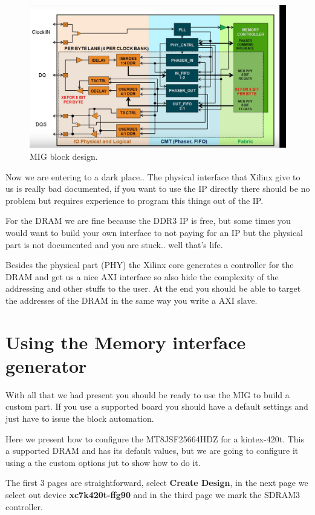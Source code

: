 \begin{figure}
    \centering
    \includegraphics[scale=0.35]{img/mig_phy.png}
    \caption{MIG block design.}
    \label{fig:mig_phy}
\end{figure}


Now we are entering to a dark place.. The physical interface that Xilinx give to us is really bad documented, if you want to use the IP directly there should be no problem but requires experience to program this things out of the IP.

For the DRAM we are fine because the DDR3 IP is free, but some times you would want to build your own interface to not paying for an IP but the physical part is not documented and you are stuck.. well that's life.


Besides the physical part (PHY) the Xilinx core generates a controller for the DRAM and get us a nice AXI interface so also hide the complexity of the addressing and other stuffs to the user. At the end you should be able to target the addresses of the DRAM in the same way you write a AXI slave.


\section{Using the Memory interface generator}

With all that we had present you should be ready to use the MIG to build a custom part. If you use a supported board you should have a default settings and just have to issue the block automation.

Here we present how to configure the MT8JSF25664HDZ for a kintex-420t. This a supported DRAM and has its default values, but we are going to configure it using a the custom options jut to show how to do it.

The first 3 pages are straightforward, select \textbf{Create Design}, in the next page we select out device \textbf{xc7k420t-ffg90} and in the third page we mark the SDRAM3 controller.

